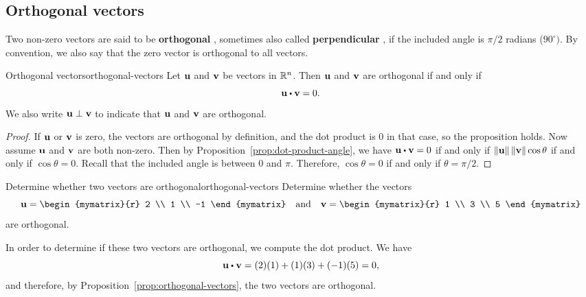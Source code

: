 \subsection{Orthogonal vectors}

Two non-zero vectors are said to be \textbf{orthogonal}%
%
, sometimes also called
\textbf{perpendicular}%
%
, if the included angle is $\pi /2$
radians ($90^{\circ })$. By convention, we also say that the zero
vector is orthogonal to all vectors.

\begin{proposition}{Orthogonal vectors}{orthogonal-vectors}
  Let $\vect{u}$ and $\vect{v}$ be vectors in $\mathbb{R}^n$. Then $\vect{u}$
  and $\vect{v}$ are orthogonal if and only
  if
  \begin{equation*}
    \vect{u} \dotprod \vect{v} = 0.
  \end{equation*}
  We also write $\vect{u}\orth\vect{v}$ to indicate that $\vect{u}$
  and $\vect{v}$ are orthogonal.
\end{proposition}

\begin{proof}
  If $\vect{u}$ or $\vect{v}$ is zero, the vectors are orthogonal by
  definition, and the dot product is $0$ in that case, so the
  proposition holds. Now assume $\vect{u}$ and $\vect{v}$ are both
  non-zero.  Then by Proposition~\ref{prop:dot-product-angle}, we have
  $\vect{u} \dotprod \vect{v} = 0$ if and only if
  $\norm{\vect{u}} \norm{\vect{v}} \cos \theta$ if and only if
  $\cos\theta=0$. Recall that the included angle is between $0$ and
  $\pi$. Therefore, $\cos\theta=0$ if and only if $\theta=\pi/2$.
\end{proof}

\begin{example}{Determine whether two vectors are orthogonal}{orthogonal-vectors}
Determine whether the vectors
\begin{equation*}
\vect{u}=
\begin{mymatrix}{r}
2 \\
1 \\
-1
\end{mymatrix}
\quad\mbox{and}\quad
\vect{v}
=
\begin{mymatrix}{r}
1 \\
3 \\
5
\end{mymatrix}
\end{equation*}
are orthogonal.
\end{example}

\begin{solution}
  In order to determine if these two vectors are orthogonal, we
  compute the dot product. We have
  \begin{equation*}
    \vect{u} \dotprod \vect{v}
    =
    (2)(1) + (1)(3) + (-1)(5)
    =
    0,
  \end{equation*}
  and therefore, by Proposition~\ref{prop:orthogonal-vectors}, the two vectors are orthogonal.
\end{solution}
